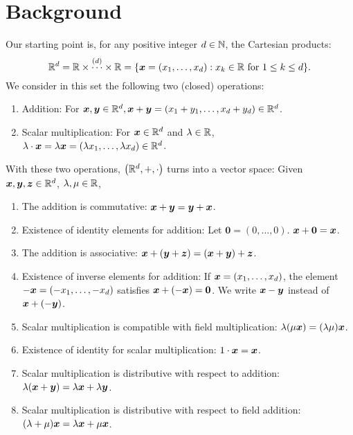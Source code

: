 

\chapter{Background}

Our starting point is, for any positive integer $d \in \mathbb{N}$, the Cartesian products:
\begin{equation*}
\mathbb{R}^d = \mathbb{R} \times \overset{(d)}{\dotsb} \times \mathbb{R} =\{ \boldsymbol{x} = (x_1, \dotsc, x_d) : x_k \in \mathbb{R} \text{ for } 1\leq k \leq d\}.
\end{equation*}
We consider in this set the following two (closed) operations:
\begin{enumerate}
	\item Addition: For $\boldsymbol{x}, \boldsymbol{y} \in \mathbb{R}^d, \boldsymbol{x} + \boldsymbol{y} = (x_1+y_1, \dotsc, x_d+y_d) \in \mathbb{R}^d$.
	\item Scalar multiplication: For $\boldsymbol{x} \in \mathbb{R}^d$ and $\lambda \in \mathbb{R}$, $\lambda \cdot \boldsymbol{x} = \lambda \boldsymbol{x} = (\lambda x_1, \dotsc, \lambda x_d) \in \mathbb{R}^d$.
\end{enumerate}
With these two operations, $\big( \mathbb{R}^d, +, \cdot\big)$ turns into a vector space: Given $\boldsymbol{x}, \boldsymbol{y}, \boldsymbol{z} \in \mathbb{R}^d$, $\lambda, \mu \in \mathbb{R}$,
\begin{enumerate}
	\item The addition is commutative: $\boldsymbol{x} + \boldsymbol{y} = \boldsymbol{y} + \boldsymbol{x}$.
	\item Existence of identity elements for addition: Let $\boldsymbol{0} = (0, \dotsc, 0)$. $\boldsymbol{x} + \boldsymbol{0} = \boldsymbol{x}$. 
	\item The addition is associative: $\boldsymbol{x} + (\boldsymbol{y} + \boldsymbol{z}) = (\boldsymbol{x} + \boldsymbol{y}) + \boldsymbol{z}$.
	\item Existence of inverse elements for addition: If $\boldsymbol{x} = (x_1, \dotsc, x_d)$, the element $-\boldsymbol{x} = (-x_1, \dotsc, -x_d)$ satisfies $\boldsymbol{x} + (-\boldsymbol{x}) = \boldsymbol{0}$.  We write $\boldsymbol{x} - \boldsymbol{y}$ instead of $\boldsymbol{x} + (-\boldsymbol{y})$.
	\item Scalar multiplication is compatible with field multiplication: $\lambda (\mu \boldsymbol{x}) = (\lambda \mu) \boldsymbol{x}$.
	\item Existence of identity for scalar multiplication: $1 \cdot \boldsymbol{x} = \boldsymbol{x}$.
	\item Scalar multiplication is distributive with respect to addition: $\lambda (\boldsymbol{x} + \boldsymbol{y}) = \lambda \boldsymbol{x} + \lambda \boldsymbol{y}$.
	\item Scalar multiplication is distributive with respect to field addition: $(\lambda + \mu)\boldsymbol{x} = \lambda \boldsymbol{x} + \mu\boldsymbol{x}$.
\end{enumerate}

